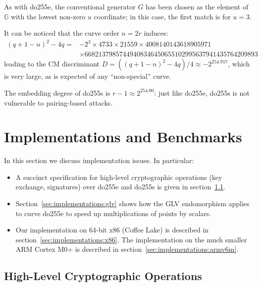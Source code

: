 \documentclass{llncs}
\newcommand{\bG}{\mathbb{G}}
\begin{document}
\vspace{2ex}
As with do255e, the conventional generator $G$ has been chosen as the
element of $\bG$ with the lowest non-zero $u$ coordinate; in this case,
the first match is for $u = 3$.

It can be noticed that the curve order $n = 2r$ induces:
\begin{align*}
    (q+1-n)^2 - 4q = &-2^3 \times 4733 \times 21559 \times 4008140143618905971 \\
    & \times 66821379857449408346450655102995637941435764209893
\end{align*}
leading to the CM discriminant $D = ((q+1-n)^2 - 4q)/4 \approx
-2^{254.917}$, which is very large, as is expected of any ``non-special''
curve.

The embedding degree of do255s is $r-1 \approx 2^{254.00}$: just like
do255e, do255s is not vulnerable to pairing-based attacks.

\section{Implementations and Benchmarks}\label{sec:implementations}

In this section we discuss implementation issues. In particular:
\begin{itemize}

    \item A succinct specification for high-level cryptographic operations
    (key exchange, signatures) over do255e and do255s is given in
    section~\ref{sec:implementations:algs}.

    \item Section~\ref{sec:implementations:glv} shows how the GLV
    endomorphism applies to curve do255e to speed up multiplications
    of points by scalars.

    \item Our implementation on 64-bit x86 (Coffee Lake) is described in
    section~\ref{sec:implementations:x86}. The implementation on the
    much smaller ARM Cortex M0+ is described in
    section~\ref{sec:implementations:armv6m}.

\end{itemize}

\subsection{High-Level Cryptographic Operations}\label{sec:implementations:algs}
\end{document}
